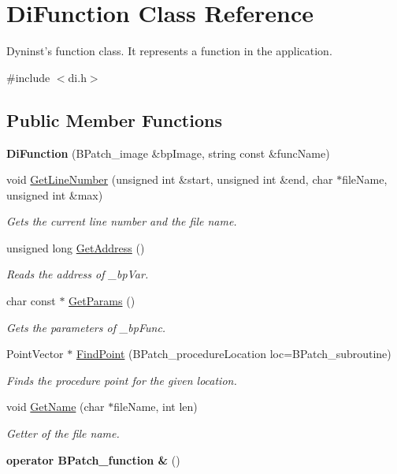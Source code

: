 \hypertarget{class_di_function}{\section{Di\-Function Class Reference}
\label{class_di_function}
}


Dyninst's function class. It represents a function in the application.  




{\ttfamily \#include $<$di.\-h$>$}

\subsection*{Public Member Functions}
\begin{DoxyCompactItemize}
\item 
\hypertarget{class_di_function_adeec90e7f3aff80b77c451cddc47941f}{{\bfseries Di\-Function} (B\-Patch\-\_\-image \&bp\-Image, string const \&func\-Name)}\label{class_di_function_adeec90e7f3aff80b77c451cddc47941f}

\item 
void \hyperlink{class_di_function_a0f72a27e659c6593d7b514507265dec8}{Get\-Line\-Number} (unsigned int \&start, unsigned int \&end, char $\ast$file\-Name, unsigned int \&max)
\begin{DoxyCompactList}\small\item\em Gets the current line number and the file name. \end{DoxyCompactList}\item 
unsigned long \hyperlink{class_di_function_a84996228fdec848ff14b1b3f04cedcb3}{Get\-Address} ()
\begin{DoxyCompactList}\small\item\em Reads the address of \-\_\-bp\-Var. \end{DoxyCompactList}\item 
char const $\ast$ \hyperlink{class_di_function_a8fe2de104488ec6714cd44614b79e3ca}{Get\-Params} ()
\begin{DoxyCompactList}\small\item\em Gets the parameters of \-\_\-bp\-Func. \end{DoxyCompactList}\item 
Point\-Vector $\ast$ \hyperlink{class_di_function_aabc45084deadfa69588048023e538840}{Find\-Point} (B\-Patch\-\_\-procedure\-Location loc=B\-Patch\-\_\-subroutine)
\begin{DoxyCompactList}\small\item\em Finds the procedure point for the given location. \end{DoxyCompactList}\item 
void \hyperlink{class_di_function_a4c471073fa7f0f0d313ff2fee7b6d988}{Get\-Name} (char $\ast$file\-Name, int len)
\begin{DoxyCompactList}\small\item\em Getter of the file name. \end{DoxyCompactList}\item 
\hypertarget{class_di_function_a7ea5b551ae1e57d98e617ba8ba3ddc3c}{{\bfseries operator B\-Patch\-\_\-function \&} ()}\label{class_di_function_a7ea5b551ae1e57d98e617ba8ba3ddc3c}


\end{DoxyCompactItemize}
